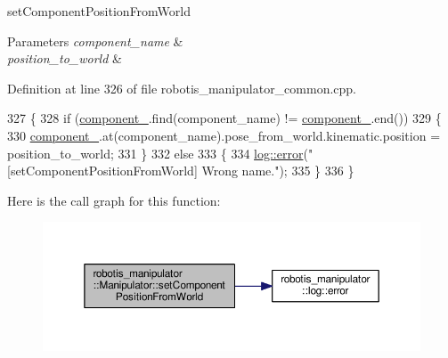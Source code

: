 set\+Component\+Position\+From\+World 


\begin{DoxyParams}{Parameters}
{\em component\+\_\+name} & \\
\hline
{\em position\+\_\+to\+\_\+world} & \\
\hline
\end{DoxyParams}


Definition at line 326 of file robotis\+\_\+manipulator\+\_\+common.\+cpp.


\begin{DoxyCode}
327 \{
328   \textcolor{keywordflow}{if} (\hyperlink{classrobotis__manipulator_1_1_manipulator_a20b388b821f161972c2cf737fe1c26db}{component\_}.find(component\_name) != \hyperlink{classrobotis__manipulator_1_1_manipulator_a20b388b821f161972c2cf737fe1c26db}{component\_}.end())
329   \{
330     \hyperlink{classrobotis__manipulator_1_1_manipulator_a20b388b821f161972c2cf737fe1c26db}{component\_}.at(component\_name).pose\_from\_world.kinematic.position = position\_to\_world;
331   \}
332   \textcolor{keywordflow}{else}
333   \{
334     \hyperlink{namespacerobotis__manipulator_1_1log_a6a84cb5481107ad244344093086fb557}{log::error}(\textcolor{stringliteral}{"[setComponentPositionFromWorld] Wrong name."});
335   \}
336 \}
\end{DoxyCode}


Here is the call graph for this function\+:\nopagebreak
\begin{figure}[H]
\begin{center}
\leavevmode
\includegraphics[width=350pt]{classrobotis__manipulator_1_1_manipulator_ab3b7bbd92252755711019606642f83c6_cgraph}
\end{center}
\end{figure}


